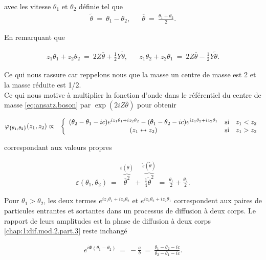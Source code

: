 avec les vitesse $\theta_1$ et $\theta_2$ définie tel que 
\begin{eqnarray}
	\tilde{\theta} ~=~\theta_1 - \theta_2 , & &	\overline{\theta}~=~\frac{\theta_1 + \theta_2}{2}.	
\end{eqnarray}

En remarquant que 

\begin{eqnarray*}
	z_1 \theta_1  + z_2  \theta_2 ~=~ 2Z\overline{\theta} + \frac{1}{2}Y\tilde{\theta}, & & z_1 \theta_2  + z_2  \theta_1 ~=~ 2Z\overline{\theta} - \frac{1}{2}Y\tilde{\theta}. 
\end{eqnarray*}

Ce qui nous rassure car reppelons nous que la masse un centre de masse est 2 et la masse réduite est 1/2. \\
Ce qui nous motive à multiplier la fonction d'onde dans le référentiel du centre de masse \eqref{eq:ansatz.boson} par $\exp(2iZ\overline{\theta})$ pour obtenir 

\begin{eqnarray}\label{eq:I-1-10}
	\varphi_{\{\theta_1 , \theta_2\}}(z_1 , z_2) & \propto &  \left \{ \begin{array} { c cl} ( \theta_2 - \theta_1 - ic) e^{ i z_1 \theta_1 + iz_2 \theta_2 } - ( \theta_1 - \theta_2 - ic) e^{ i z_1 \theta_2 + iz_2 \theta_1} & \mbox{si} & z_1 < z_2 \\ (z_1 \leftrightarrow z_2) & \mbox{si} & z_1 > z_2 \end{array} \right.
\end{eqnarray}

correspondant aux valeurs propres

\begin{eqnarray}
	\varepsilon(\theta_1 , \theta_2) ~=~ \overbrace{ \overline{\theta}^2}^{\overline{\varepsilon}(\overline{\theta})}	 + \overbrace{\frac{1}{4} \tilde{\theta}^2}^{\tilde{\varepsilon}(\tilde{\theta})} ~=~ \frac{\theta_1}{2} + \frac{\theta_2}{2}.	
\end{eqnarray}

Pour $\theta_1 > \theta_2$, les deux termes $e^{iz_1 \theta_1 + iz_2 \theta_2 }$ et $e^{iz_1 \theta_2 + iz_2 \theta_1 }$ correspondent aux paires de particules entrantes et sortantes dans un processus de diffusion à deux corps. Le rapport de leurs amplitudes est la phase de diffusion à deux corps \eqref{chap:1:dif.mod.2.part.3} reste inchangé

\begin{eqnarray}\label{chap:1:dif.mod.2.part.3}
	e^{i\Phi ( \theta_1 - \theta_2  ) }~=~ -\frac{a}{b} ~=~\frac{\theta_1 - \theta_2  -ic} { \theta_2 - \theta_1  - ic}. 
\end{eqnarray}


